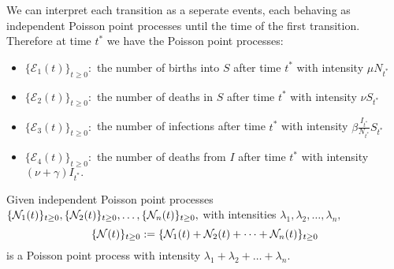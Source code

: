 We can interpret each transition as a seperate events, each behaving as independent Poisson point processes until the time of the first transition. Therefore at time $t^*$ we have the Poisson point processes: \begin{itemize}
    \item $\{\mathcal{E}_1(t)\}_{t\geq 0}:$ the number of births into $S$ after time $t^*$ with intensity $\mu N_{t^*}$
    \item $\{\mathcal{E}_2(t)\}_{t\geq 0}:$ the number of deaths in $S$ after time $t^*$ with intensity $\nu S_{t^*}$
    \item $\{\mathcal{E}_3(t)\}_{t\geq 0}:$ the number of infections after time $t^*$ with intensity $\beta \frac{I_{t^*}}{N_{t^*}} S_{t^*}$
    \item $\{\mathcal{E}_4(t)\}_{t\geq 0}:$ the number of deaths from $I$ after time $t^*$ with intensity $(\nu + \gamma) I_{t^*}.$
\end{itemize}

\begin{theorem}\label{thm:sum_ppp}
    Given independent Poisson point processes $\{\mathcal{N}_1(t)\}_{t\geq0},
        \{\mathcal{N}_2(t)\}_{t\geq0}, \dots,  \{\mathcal{N}_n(t)\}_{t\geq0},$ with intensities
    $\lambda_1, \lambda_2, \dots, \lambda_n,$
    $$\{\mathcal{N}(t)\}_{t\geq0} := \{\mathcal{N}_1(t) + \mathcal{N}_2(t) + \dots + \mathcal{N}_n(t)\}_{t\geq0}$$ is a Poisson point process with intensity $\lambda_1 + \lambda_2 + \dots +
        \lambda_n.$
\end{theorem}


